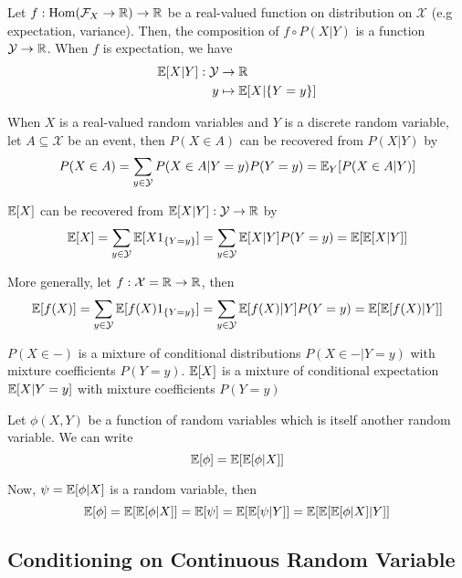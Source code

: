 \documentclass{report}
\begin{document}
\begin{definition}
	Let $f: \operatorname{Hom}(\mathcal{F}_X \to \mathbb{R}) \to \mathbb{R}$ be a real-valued function on distribution on $\mathcal{X}$ (e.g expectation, variance). Then, the composition of $f \circ P(X|Y)$ is a function $\mathcal{Y} \to \mathbb{R}$. When $f$ is expectation, we have
	\begin{align*}
		\mathbb{E}[X|Y]: \mathcal{Y} &\to \mathbb{R} \\
							y &\mapsto \mathbb{E}[X| \{Y = y\}]
	\end{align*}
\end{definition}

\begin{proposition}
	When $X$ is a real-valued random variables and $Y$ is a discrete random variable, let $A \subseteq \mathcal{X}$ be an event, then $P(X \in A)$ can be recovered from $P(X|Y)$ by
	$$
		P(X \in A) = \sum_{y \in \mathcal{Y}} P(X \in A | Y = y) P(Y = y) = \mathbb{E}_Y[P(X \in A | Y)]
	$$
	
	$\mathbb{E}[X]$ can be recovered from $\mathbb{E}[X|Y]: \mathcal{Y} \to \mathbb{R}$ by
	$$
		\mathbb{E}[X] = \sum_{y \in \mathcal{Y}} \mathbb{E}[X 1_{\{Y = y\}}] = \sum_{y \in \mathcal{Y}} \mathbb{E}[X|Y] P(Y=y) = \mathbb{E}[\mathbb{E}[X|Y]]
	$$
	
	More generally, let $f: \mathcal{X} = \mathbb{R} \to \mathbb{R}$, then
	$$
		\mathbb{E}[f(X)] = \sum_{y \in \mathcal{Y}} \mathbb{E}[f(X) 1_{\{Y = y\}}] = \sum_{y \in \mathcal{Y}} \mathbb{E}[f(X)|Y] P(Y=y) = \mathbb{E}[\mathbb{E}[f(X)|Y]]
	$$
	
	$P(X \in -)$ is a mixture of conditional distributions $P(X \in - | Y = y)$ with mixture coefficients $P(Y = y)$. $\mathbb{E}[X]$ is a mixture of conditional expectation $\mathbb{E}[X | Y=y]$ with mixture coefficients $P(Y=y)$
\end{proposition}

\begin{remark}
	Let $\phi(X, Y)$ be a function of random variables which is itself another random variable. We can write
	$$
		\mathbb{E}[\phi] = \mathbb{E}[\mathbb{E}[\phi | X]]
	$$
	
	Now, $\psi = \mathbb{E}[\phi | X]$ is a random variable, then
	$$
		\mathbb{E}[\phi] = \mathbb{E}[\mathbb{E}[\phi | X]] = \mathbb{E}[\psi] = \mathbb{E}[\mathbb{E}[\psi | Y]] = \mathbb{E}[\mathbb{E}[ \mathbb{E}[\phi | X] | Y]]
	$$
\end{remark}


\subsection{Conditioning on Continuous Random Variable}
\end{document}
